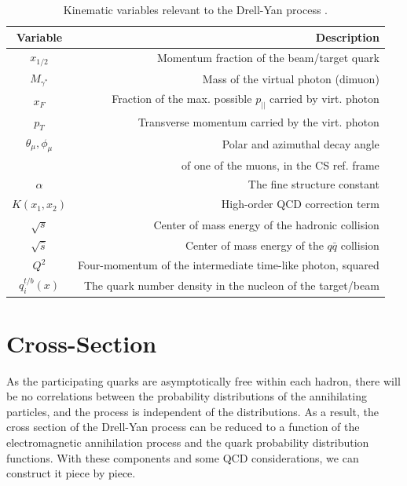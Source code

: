 \begin{table}[h]
	\centering
	\begin{tabular}{c|r}
		Variable&Description\\ \hline \hline
		$x_{1/2}$ & Momentum fraction of the beam/target quark\\
		$M_{\gamma^*}$ & Mass of the virtual photon (dimuon)\\
		$x_F$ & Fraction of the max. possible $p_{||}$ carried by virt. photon\\
		$p_T$ & Transverse momentum carried by the virt. photon\\
		$\theta_{\mu}, \phi_{\mu}$ & Polar and azimuthal decay angle\\ & of one of the muons, in the CS ref. frame\\ \hline
		$\alpha$ & The fine structure constant \\
		$K(x_1,x_2)$ & High-order QCD correction term \\
		$\sqrt{s}$ & Center of mass energy of the hadronic collision \\
		$\sqrt{\hat{s}}$ & Center of mass energy of the $q\bar{q}$ collision \\
		$Q^{2}$ & Four-momentum of the intermediate time-like photon, squared \\ 
		$q_i^{t/b}(x)$ & The quark number density in the nucleon of the target/beam \\ \hline \hline
	\end{tabular}
	\caption{Kinematic variables relevant to the Drell-Yan process .}
	\label{tab:var}
\end{table}

\section{Cross-Section}

As the participating quarks are asymptotically free within each hadron, there will be no correlations between the probability distributions of the annihilating particles, and the process is independent of the distributions. As a result, the cross section of the Drell-Yan process can be reduced to a function of the electromagnetic annihilation process and the quark probability distribution functions. With these components and some QCD considerations, we can construct it piece by piece.

